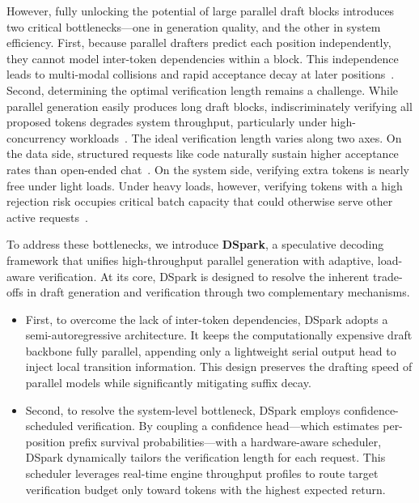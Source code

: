 However, fully unlocking the potential of large parallel draft blocks introduces two critical bottlenecks—one in generation quality, and the other in system efficiency.
First, because parallel drafters predict each position independently, they cannot model inter-token dependencies within a block. This independence leads to multi-modal collisions and rapid acceptance decay at later positions~\citep{gu2018nonautoregressive,pmlr-v162-huang22m}. 
Second, determining the optimal verification length remains a challenge. While parallel generation easily produces long draft blocks, indiscriminately verifying all proposed tokens degrades system throughput, particularly under high-concurrency workloads~\citep{liu2024turbospec,hu2026echo}. The ideal verification length varies along two axes. 
On the data side, structured requests like code naturally sustain higher acceptance rates than open-ended chat~\citep{xia-etal-2024-unlocking,abramovich2026speed}. 
On the system side, verifying extra tokens is nearly free under light loads. Under heavy loads, however, verifying tokens with a high rejection risk occupies critical batch capacity that could otherwise serve other active requests~\citep{liu2024optimizing, wu-etal-2025-tetris}.

To address these bottlenecks, we introduce \textbf{DSpark}, a speculative decoding framework that unifies high-throughput parallel generation with adaptive, load-aware verification. At its core, DSpark is designed to resolve the inherent trade-offs in draft generation and verification through two complementary mechanisms. 
\begin{itemize}
    \setlength{\itemsep}{10pt}
    \item First, to overcome the lack of inter-token dependencies, DSpark adopts a semi-autoregressive architecture. It keeps the computationally expensive draft backbone fully parallel, appending only a lightweight serial output head to inject local transition information. This design preserves the drafting speed of parallel models while significantly mitigating suffix decay.
    \item Second, to resolve the system-level bottleneck, DSpark employs confidence-scheduled verification. By coupling a confidence head—which estimates per-position prefix survival probabilities—with a hardware-aware scheduler, DSpark dynamically tailors the verification length for each request. This scheduler leverages real-time engine throughput profiles to route target verification budget only toward tokens with the highest expected return.
\end{itemize}

